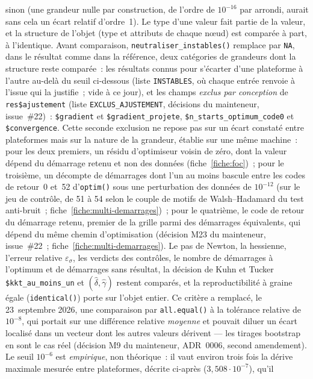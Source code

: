 \documentclass[a4paper,11pt]{article}
\newcommand{\code}[1]{\texttt{\small #1}}
\begin{document}
sinon (une grandeur nulle par construction, de l'ordre de $10^{-16}$ par
arrondi, aurait sans cela un écart relatif d'ordre~1). Le type d'une valeur
fait partie de la valeur, et la structure de l'objet (type et attributs de
chaque n\oe ud) est comparée à part, à l'identique. Avant comparaison,
\code{neutraliser\_instables()} remplace par \code{NA}, dans le résultat comme dans la
référence, deux catégories de grandeurs dont la structure reste comparée~: les résultats connus
pour s'écarter d'une plateforme à l'autre au-delà du seuil ci-dessous (liste
\code{INSTABLES}, où chaque entrée renvoie à l'issue qui la justifie~; vide à ce jour), et les
champs \emph{exclus par conception} de \code{res\$ajustement} (liste
\code{EXCLUS\_AJUSTEMENT}, décisions du mainteneur, issue~\#22)~: \code{\$gradient} et
\code{\$gradient\_projete}, \code{\$n\_starts\_optimum\_code0} et \code{\$convergence}. Cette
seconde exclusion ne
repose pas sur un écart constaté entre plateformes mais sur la nature de la grandeur, établie sur
une même machine~: pour les deux premiers, un résidu d'optimiseur voisin de zéro, dont la valeur
dépend du démarrage retenu et non des données (fiche~\ref{fiche:foc})~; pour le troisième, un
décompte de démarrages dont l'un au moins bascule entre les codes de retour~0 et~52 d'\code{optim()}
sous une perturbation des données de $10^{-12}$ (sur le jeu de contrôle, de 51 à 54 selon le
couple de motifs de Walsh--Hadamard du test anti-bruit~; fiche~\ref{fiche:multi-demarrages})~; pour le quatrième, le code de retour du
démarrage retenu, premier de la grille parmi des démarrages équivalents, qui dépend du même
chemin d'optimisation (décision M23 du mainteneur, issue~\#22~;
fiche~\ref{fiche:multi-demarrages}). Le pas de Newton,
la hessienne, l'erreur relative $\varepsilon_\sigma$, les verdicts des contrôles, le nombre de démarrages à l'optimum et de démarrages
sans résultat, la décision de Kuhn et Tucker \code{\$kkt\_au\_moins\_un} et
$(\hat\delta, \hat\gamma)$ restent comparés, et la reproductibilité
à graine égale (\code{identical()}) porte sur l'objet entier. Ce critère a remplacé, le
23~septembre 2026, une comparaison par \code{all.equal()} à la tolérance
relative de $10^{-8}$, qui portait sur une différence relative \emph{moyenne}
et pouvait diluer un écart localisé dans un vecteur dont les autres valeurs
dérivent --- les tirages bootstrap en sont le cas réel (décision M9 du
mainteneur, ADR~0006, second amendement). Le seuil $10^{-6}$ est
\emph{empirique}, non théorique~: il vaut environ trois fois la dérive maximale
mesurée entre plateformes, décrite ci-après ($3{,}508\cdot 10^{-7}$), qu'il
\end{document}
